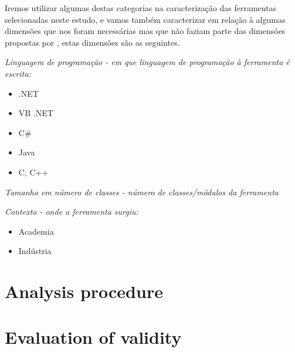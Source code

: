 Iremos utilizar algumas destas categorias na caracterização das ferramentas
selecionadas neste estudo, e vamos também caracterizar em relação à algumas dimensões que nos
foram necessárias mas que não faziam parte das dimensões propostas por ,
estas dimensões são as seguintes.

\begin{description}

  \item {\it Linguagem de programação - em que linguagem de programação à ferramenta é escrita:}
    \begin{itemize}
      \item .NET
      \item VB .NET
      \item C\#
      \item Java
      \item C, C++
    \end{itemize}

  \item {\it Tamanho em número de classes - número de classes/módulos da ferramenta}

  \item {\it Contexto - onde a ferramenta surgiu:}
    \begin{itemize}
      \item Academia
      \item Indústria
    \end{itemize}

\end{description}


\section{Analysis procedure}

\section{Evaluation of validity}
